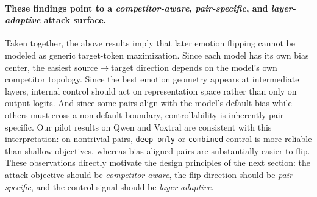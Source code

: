 \paragraph{These findings point to a \emph{competitor-aware}, \emph{pair-specific}, and \emph{layer-adaptive} attack surface.}
Taken together, the above results imply that later emotion flipping cannot be modeled as generic target-token maximization. Since each model has its own bias center, the easiest source$\rightarrow$target direction depends on the model's own competitor topology. Since the best emotion geometry appears at intermediate layers, internal control should act on representation space rather than only on output logits. And since some pairs align with the model's default bias while others must cross a non-default boundary, controllability is inherently pair-specific. Our pilot results on Qwen and Voxtral are consistent with this interpretation: on nontrivial pairs, \texttt{deep-only} or \texttt{combined} control is more reliable than shallow objectives, whereas bias-aligned pairs are substantially easier to flip. These observations directly motivate the design principles of the next section: the attack objective should be \emph{competitor-aware}, the flip direction should be \emph{pair-specific}, and the control signal should be \emph{layer-adaptive}.
